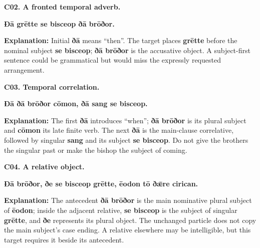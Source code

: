 \par\begin{minipage}{\linewidth}\raggedright
\textbf{C02. A fronted temporal adverb.}

\textbf{Ðā grētte se bisceop ðā brōðor.}

\textbf{Explanation:} Initial \textbf{ðā} means “then”. The target places \textbf{grētte} before the nominal subject \textbf{se bisceop}; \textbf{ðā brōðor} is the accusative object. A subject-first sentence could be grammatical but would miss the expressly requested arrangement.

\end{minipage}\par\addvspace{4pt}

\par\begin{minipage}{\linewidth}\raggedright
\textbf{C03. Temporal correlation.}

\textbf{Ðā ðā brōðor cōmon, ðā sang se bisceop.}

\textbf{Explanation:} The first \textbf{ðā} introduces “when”; \textbf{ðā brōðor} is its plural subject and \textbf{cōmon} its late finite verb. The next \textbf{ðā} is the main-clause correlative, followed by singular \textbf{sang} and its subject \textbf{se bisceop}. Do not give the brothers the singular past or make the bishop the subject of coming.

\end{minipage}\par\addvspace{4pt}

\par\begin{minipage}{\linewidth}\raggedright
\textbf{C04. A relative object.}

\textbf{Ðā brōðor, ðe se bisceop grētte, ēodon tō ðǣre cirican.}

\textbf{Explanation:} The antecedent \textbf{ðā brōðor} is the main nominative plural subject of \textbf{ēodon}; inside the adjacent relative, \textbf{se bisceop} is the subject of singular \textbf{grētte}, and \textbf{ðe} represents its plural object. The unchanged particle does not copy the main subject’s case ending. A relative elsewhere may be intelligible, but this target requires it beside its antecedent.

\end{minipage}\par\addvspace{4pt}

